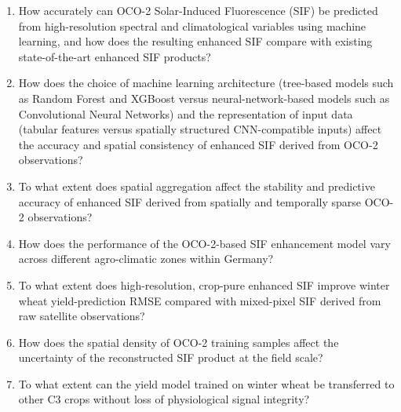 \begin{enumerate}
    \item[\textbf{RQ1:}] How accurately can OCO-2 Solar-Induced Fluorescence (SIF) be predicted from high-resolution spectral and climatological variables using machine learning, and how does the resulting enhanced SIF compare with existing state-of-the-art enhanced SIF products?

    \item[\textbf{RQ2:}] How does the choice of machine learning architecture (tree-based models such as Random Forest and XGBoost versus neural-network-based models such as Convolutional Neural Networks) and the representation of input data (tabular features versus spatially structured CNN-compatible inputs) affect the accuracy and spatial consistency of enhanced SIF derived from OCO-2 observations?

    \item[\textbf{RQ3:}] To what extent does spatial aggregation affect the stability and predictive accuracy of enhanced SIF derived from spatially and temporally sparse OCO-2 observations?

    \item[\textbf{RQ4:}] How does the performance of the OCO-2-based SIF enhancement model vary across different agro-climatic zones within Germany?

    \item[\textbf{RQ5:}] To what extent does high-resolution, crop-pure enhanced SIF improve winter wheat yield-prediction RMSE compared with mixed-pixel SIF derived from raw satellite observations?

    \item[\textbf{RQ6:}] How does the spatial density of OCO-2 training samples affect the uncertainty of the reconstructed SIF product at the field scale?

    \item[\textbf{RQ7:}] To what extent can the yield model trained on winter wheat be transferred to other C3 crops without loss of physiological signal integrity?
\end{enumerate}


